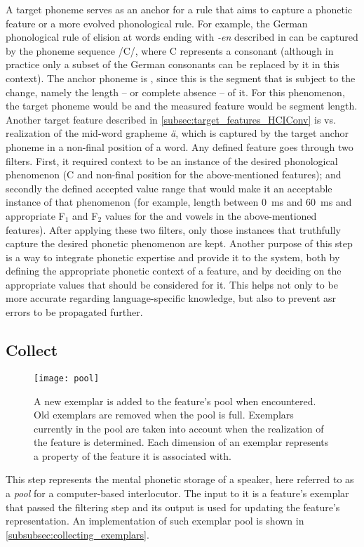 A target phoneme serves as an anchor for a rule that aims to capture a phonetic feature or a more evolved phonological rule.
For example, the German phonological rule of \textipa{[@]} elision at words ending with \emph{-en} described in  can be captured by the phoneme sequence /C/, where C represents a consonant (although in practice only a subset of the German consonants can be replaced by it in this context).
The anchor phoneme is \textipa{[@]}, since this is the segment that is subject to the change, namely the length -- or complete absence -- of it.
For this phenomenon, the target phoneme would be  and the measured feature would be segment length.
Another target feature described in \cref{subsec:target_features_HCIConv} is \textipa{[e:]} vs.\ \textipa{[E:]} realization of the mid-word grapheme \emph{ä}, which is captured by the target anchor phoneme \textipa{[E]} in a non-final position of a word.
Any defined feature goes through two filters. First, it required context to be an instance of the desired phonological phenomenon (C and non-final position for the above-mentioned features);
and secondly the defined accepted value range that would make it an acceptable instance of that phenomenon (for example, \textipa{[@]} length between \SI{0}{\milli\second} and \SI{60}{\milli\second} and appropriate F$_1$ and F$_2$ values for the \textipa{[e:]} and \textipa{[E:]} vowels in the above-mentioned features).
After applying these two filters, only those instances that truthfully capture the desired phonetic phenomenon are kept.
Another purpose of this step is a way to integrate phonetic expertise and provide it to the system, both by defining the appropriate phonetic context of a feature, and by deciding on the appropriate values that should be considered for it.
This helps not only to be more accurate regarding language-specific knowledge, but also to prevent \ac{asr} errors to be propagated further.

\subsection{Collect}
\label{subsec:collect}


\begin{figure}[t]
	\centering
	\texttt{[image: pool]}
	\caption[The exemplar pool]
		{A new exemplar is added to the feature's pool when encountered.
		Old exemplars are removed when the pool is full.
		Exemplars currently in the pool are taken into account when the realization of the feature is determined.
		Each dimension of an exemplar represents a property of the feature it is associated with.}
	\label{fig:exemplar_pool}
\end{figure}
%
This step represents the mental phonetic storage of a speaker, here referred to as a \emph{pool} for a computer-based interlocutor.
The input to it is a feature's exemplar that passed the filtering step and its output is used for updating the feature's representation.
An implementation of such exemplar pool is shown in \cref{subsubsec:collecting_exemplars}.

